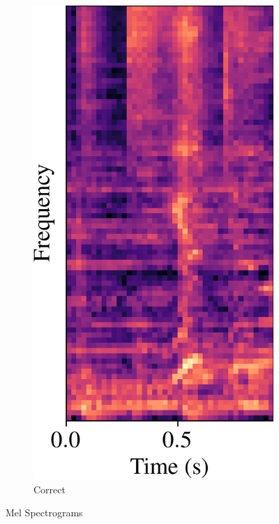 \documentclass[conference]{IEEEtran}
\begin{document}
\begin{figure}[htbp]
\begin{subfigure}[b]{0.32\columnwidth}
    \end{subfigure}
    \hfill
    \begin{subfigure}[b]{0.32\columnwidth}
        \centerline{\includegraphics[width=\columnwidth]{spec_incorrect_2.png}}
        \caption{Correct}
        \label{spec_incorrect_2}
    \end{subfigure}
    \caption{Mel Spectrograms}
    \label{Spectrograms}
\end{figure}
\end{document}
